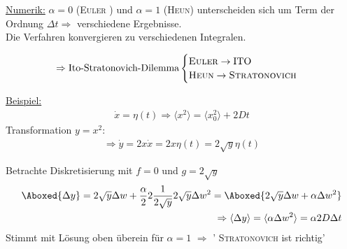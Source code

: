 \documentclass[12pt]{article}
\begin{document}

\underline{Numerik:} 
$\alpha = 0 $ (\textsc{Euler}
) und $\alpha = 1$ (\textsc{Heun}) unterscheiden sich um Term der Ordnung $\Delta t \Rightarrow $ verschiedene Ergebnisse. \\ 
Die Verfahren konvergieren zu verschiedenen Integralen.

\begin{align} \Rightarrow \text{Ito-Stratonovich-Dilemma}
\begin{cases}
\textsc{Euler} \to \text{ITO} \\
\textsc{Heun} \to \textsc{Stratonovich}
\end{cases}
\end{align}

\underline{Beispiel:}
 \begin{align}
\dot{x}= \eta (t) \Rightarrow \langle x^2 \rangle = \langle x_0^2 \rangle + 2Dt
\end{align}
Transformation $y=x^2$:
\begin{align}
\Rightarrow \dot{y}= 2 x \dot{x} = 2 x \eta (t) = 2 \sqrt{y} \eta (t)
\end{align}

Betrachte Diskretisierung mit $f=0$ und $g= 2 \sqrt{y}$ 
\begin{align}
\Aboxed{\Delta y} = 2 \sqrt{y} \Delta w + \frac{\alpha}{2} 2 \frac{1}{2 \sqrt{y}} 2 \sqrt{y} \Delta w^2 = \Aboxed{2 \sqrt{y} \Delta w + \alpha \Delta w^2 }\\
\Rightarrow \langle \Delta y \rangle = \langle \alpha \Delta w^2 \rangle = \alpha 2 D \Delta t
\end{align}
Stimmt mit Lösung oben überein für $ \alpha = 1$ $\Rightarrow$ ' \textsc{Stratonovich} ist richtig'
\end{document}
